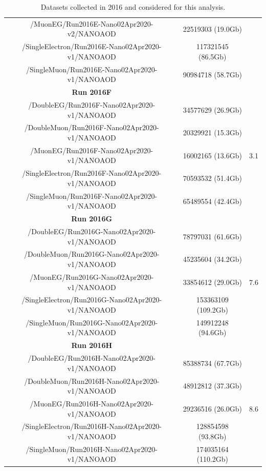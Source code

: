 \documentclass[a4paper, 10pt, openright]{report}
\begin{document}
\begin{appendices}
\begin{table}
\begin{center}
{\begin{tabular}{ c|c|c }
 /MuonEG/Run2016E-Nano02Apr2020-v2/NANOAOD & 22519303 (19.0Gb) & \\
 /SingleElectron/Run2016E-Nano02Apr2020-v1/NANOAOD & 117321545 (86.5Gb) & \\
 /SingleMuon/Run2016E-Nano02Apr2020-v1/NANOAOD & 90984718 (58.7Gb) & \\
 \hline
 \textbf{Run 2016F} & & \\
 /DoubleEG/Run2016F-Nano02Apr2020-v1/NANOAOD & 34577629 (26.9Gb) & \multirow{ 5}{*}{3.1} \\
 /DoubleMuon/Run2016F-Nano02Apr2020-v1/NANOAOD & 20329921 (15.3Gb) & \\
 /MuonEG/Run2016F-Nano02Apr2020-v1/NANOAOD & 16002165 (13.6Gb) & \\
 /SingleElectron/Run2016F-Nano02Apr2020-v1/NANOAOD & 70593532 (51.4Gb) & \\
 /SingleMuon/Run2016F-Nano02Apr2020-v1/NANOAOD & 65489554 (42.4Gb) & \\
 \hline
 \textbf{Run 2016G} & & \\
 /DoubleEG/Run2016G-Nano02Apr2020-v1/NANOAOD & 78797031 (61.6Gb) & \multirow{ 5}{*}{7.6} \\
 /DoubleMuon/Run2016G-Nano02Apr2020-v1/NANOAOD & 45235604 (34.2Gb) & \\
 /MuonEG/Run2016G-Nano02Apr2020-v1/NANOAOD & 33854612 (29.0Gb) & \\
 /SingleElectron/Run2016G-Nano02Apr2020-v1/NANOAOD & 153363109 (109.2Gb) & \\
 /SingleMuon/Run2016G-Nano02Apr2020-v1/NANOAOD & 149912248 (94.6Gb) & \\
 \hline
 \textbf{Run 2016H} & & \\
 /DoubleEG/Run2016H-Nano02Apr2020-v1/NANOAOD & 85388734 (67.7Gb) & \multirow{ 5}{*}{8.6} \\
 /DoubleMuon/Run2016H-Nano02Apr2020-v1/NANOAOD & 48912812 (37.3Gb) & \\
 /MuonEG/Run2016H-Nano02Apr2020-v1/NANOAOD & 29236516 (26.0Gb) & \\
 /SingleElectron/Run2016H-Nano02Apr2020-v1/NANOAOD & 128854598 (93.8Gb) & \\
 /SingleMuon/Run2016H-Nano02Apr2020-v1/NANOAOD & 174035164 (110.2Gb) & \\
 \hline
\end{tabular}
}
\caption{Datasets collected in 2016 and considered for this analysis.}
\label{table:Data2016}
\end{center}
\end{table}


\end{appendices}
\end{document}
